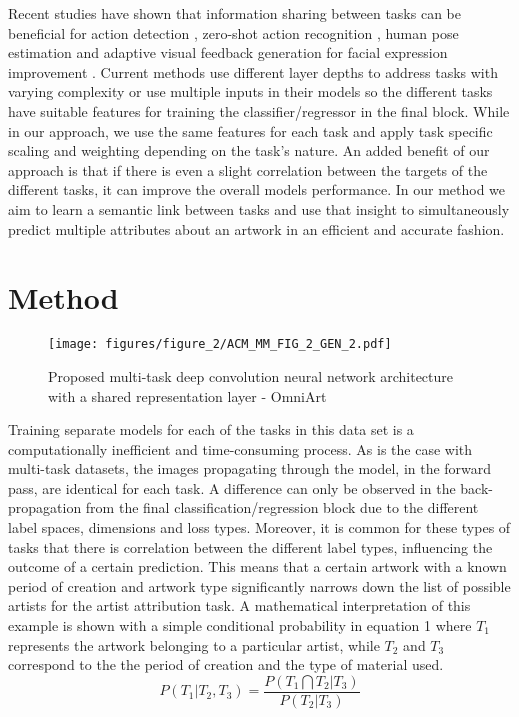 \documentclass[sigconf]{acmart}
\begin{document}
Recent studies have shown that information sharing between tasks can be beneficial \cite{yang2014unified} for action detection \cite{DBLP:journals/corr/ZhuN16c}, zero-shot action recognition \cite{DBLP:journals/corr/XuHG16}, human pose estimation \cite{wang2016human} and adaptive visual feedback generation for facial expression improvement \cite{Kaneko:2016:AVF:2964284.2967236}. Current methods use different layer depths to address tasks with varying complexity or use multiple inputs in their models so the different tasks have suitable features for training the classifier/regressor in the final block. While in our approach, we use the same features for each task and apply task specific scaling and weighting depending on the task's nature. An added benefit of our approach is that if there is even a slight correlation between the targets of the different tasks, it can improve the overall models performance. In our method we aim to learn a semantic link between tasks and use that insight to simultaneously predict multiple attributes about an artwork in an efficient and accurate fashion.

\section{Method}\begin{figure*}
  \texttt{[image: figures/figure\_2/ACM\_MM\_FIG\_2\_GEN\_2.pdf]}
  \caption{Proposed multi-task deep convolution neural network architecture with a shared representation layer - OmniArt\label{fig:omniart_artchitecture}}
\end{figure*}

Training separate models for each of the tasks in this data set is a computationally inefficient and time-consuming process. As is the case with multi-task datasets, the images propagating through the model, in the forward pass, are identical for each task. A difference can only be observed in the back-propagation from the final classification/regression block due to the different label spaces, dimensions and loss types. Moreover, it is common for these types of tasks that there is correlation between the different label types, influencing the outcome of a certain prediction. This means that a certain artwork with a known period of creation and artwork type significantly narrows down the list of possible artists for the artist attribution task. A mathematical interpretation of this example is shown with a simple conditional probability in equation 1 where
\begin{math}
T_{1}
\end{math}
represents the artwork belonging to a particular artist, while 
\begin{math}
T_{2}
\end{math}
and
\begin{math}
T_{3}
\end{math}
correspond to the the period of creation and the type of material used.
\begin{equation}
P(T_{1}|T_{2},T_{3})=\frac{P(T_{1}\bigcap T_{2}|T_{3})}{P(T_{2}|T_{3})}
\end{equation}
\end{document}
